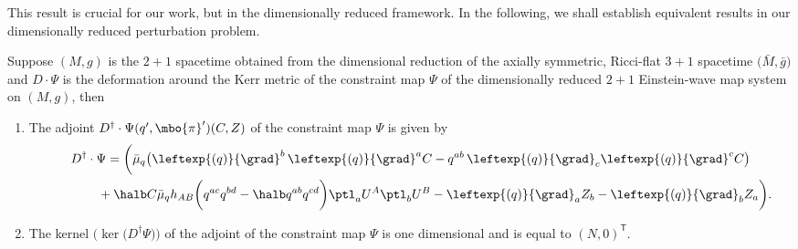  This result is crucial for our work, but in the dimensionally reduced framework. In the following, we shall establish equivalent results in our dimensionally reduced perturbation problem.
\begin{Lemma}
Suppose $(M, g)$ is the $2+1$ spacetime obtained from the dimensional reduction of the axially symmetric, Ricci-flat $3+1$ spacetime $\bigl(\bar{M}, \bar{g}\bigr)$ and $D \cdot \Psi$ is the deformation around the Kerr metric of the constraint map $\Psi$ of the dimensionally reduced $2+1$ Einstein-wave map system on $(M, g)$, then
\begin{enumerate}\itemsep=0pt
\item[$(1)$] The adjoint $D^\dagger \cdot \Psi (q', \mbo{\pi}') (C, Z) $ of the constraint map $\Psi$ is given by
\begin{gather}
D^{\dagger} \cdot \Psi = \biggl(\bar{\mu}_q \bigl(\leftexp{(q)}{\grad}^b \,\leftexp{(q)}{\grad}^a C -q^{ab}\, \leftexp{(q)}{\grad}_c \leftexp{(q)}{\grad}^c C\bigr)\nonumber\\
\hphantom{D^{\dagger} \cdot \Psi =}{}
+ \halb C \bar{\mu}_q h_{AB} \biggl(q^{ac}q^{bd} - \halb q^{ab} q^{cd}\biggr)\ptl_a U^A \ptl_b U^B
 - \leftexp{(q)}{\grad}_a Z_b - \leftexp{(q)}{\grad}_b Z_a \biggr).\label{2+1adjoint}
\end{gather}

\item[$(2)$] The kernel $\bigl(\operatorname{ker} \bigl(D^\dagger \Psi\bigr)\bigr)$ of the adjoint of the constraint map $\Psi$ is one dimensional and is equal to
$(N, 0)^{\mathsf{T}}$.
\end{enumerate}
\end{Lemma}
